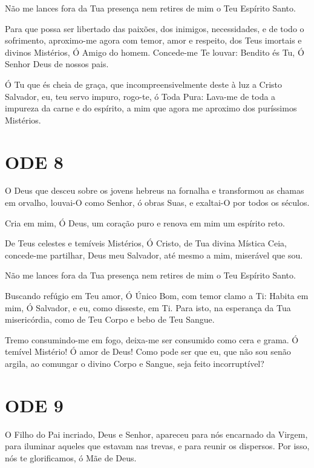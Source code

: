 \documentclass{subfiles}
\begin{document}
Não me lances fora da Tua presença nem retires de mim o Teu Espírito Santo.

Para que possa ser libertado das paixões, dos inimigos, necessidades,
e de todo o sofrimento, aproximo-me agora com temor, amor e respeito, dos
Teus imortais e divinos Mistérios, Ó Amigo do homem. Concede-me Te louvar:
Bendito és Tu, Ó Senhor Deus de nossos pais.

\Doxology{}

Ó Tu que és cheia de graça, que incompreensivelmente deste à luz a Cristo
Salvador, eu, teu servo impuro, rogo-te, ó Toda Pura: Lava-me de toda a impureza
da carne e do espírito, a mim que agora me aproximo dos puríssimos Mistérios.

\section*{ODE 8}

\eirmos{}O Deus que desceu sobre os jovens hebreus na fornalha e transformou
as chamas em orvalho, louvai-O como Senhor, ó obras Suas, e exaltai-O por
todos os séculos.

Cria em mim, Ó Deus, um coração puro e renova em mim um espírito reto.

De Teus celestes e temíveis Mistérios, Ó Cristo, de Tua divina Mística
Ceia, concede-me partilhar, Deus meu Salvador, até mesmo a mim, miserável
que sou.

Não me lances fora da Tua presença nem retires de mim o Teu Espírito Santo.

Buscando refúgio em Teu amor, Ó Único Bom, com temor clamo a Ti: Habita em mim,
Ó Salvador, e eu, como disseste, em Ti. Para isto, na esperança da Tua
misericórdia, como de Teu Corpo e bebo de Teu Sangue.

\Doxology{}

Tremo consumindo-me em fogo, deixa-me ser consumido como cera e grama. Ó temível
Mistério! Ó amor de Deus! Como pode ser que eu, que não sou senão argila, ao
comungar o divino Corpo e Sangue, seja feito incorruptível?

\section*{ODE 9}

\eirmos{}O Filho do Pai incriado, Deus e Senhor, apareceu para nós encarnado
da Virgem, para iluminar aqueles que estavam nas trevas, e para reunir os
dispersos. Por isso, nós te glorificamos, ó Mãe de Deus.
\end{document}
